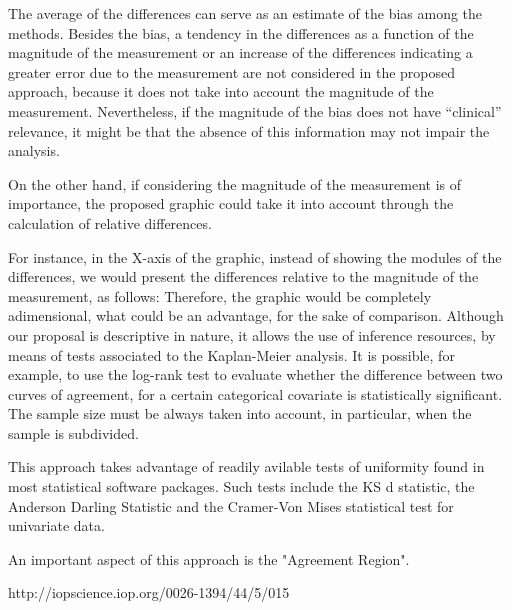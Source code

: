 The average of the differences can serve as an estimate of the bias among the methods. Besides the bias, a tendency in the
differences as a function of the magnitude of the measurement or an increase of the differences indicating a greater
error due to the measurement are not considered in the proposed approach, because it does not take into account
the magnitude of the measurement. Nevertheless, if the magnitude of the bias does not have “clinical” relevance, it
might be that the absence of this information may not impair the analysis.

On the other hand, if considering the magnitude of the measurement is of importance, the proposed graphic could
take it into account through the calculation of relative differences.

For instance, in the X-axis of the graphic, instead of showing the modules of the differences, we would present the
differences relative to the magnitude of the measurement,
as follows:
Therefore, the graphic would be completely adimensional, what could be an advantage, for the sake of comparison.
Although our proposal is descriptive in nature, it allows the use of inference resources, by means of tests associated to
the Kaplan-Meier analysis. It is possible, for example, to use the log-rank test to evaluate whether the difference between
two curves of agreement, for a certain categorical covariate is statistically significant. The sample size must
be always taken into account, in particular, when the sample is subdivided.

\newpage

This approach takes advantage of readily avilable tests of uniformity found in most statistical software packages.
Such tests include the KS d statistic, the Anderson Darling Statistic and the Cramer-Von Mises statistical test for univariate data.

An important aspect of this approach is the "Agreement Region".


http://iopscience.iop.org/0026-1394/44/5/015



